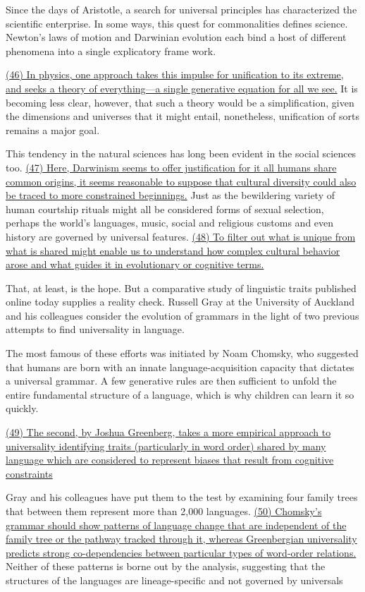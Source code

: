 
\qquad Since the days of Aristotle, a search for universal principles has characterized the scientific enterprise. In some ways, this quest for commonalities defines science. Newton's laws of motion and Darwinian evolution each bind a host of different phenomena into a single explicatory frame work.

\qquad \ul{(46) In physics, one approach takes this impulse for unification to its extreme, and seeks a theory of everything---a single generative equation for all we see.} It is becoming less clear, however, that such a theory would be a simplification, given the dimensions and universes that it might entail, nonetheless, unification of sorts remains a major goal.

\qquad This tendency in the natural sciences has long been evident in the social sciences too. \ul{(47) Here, Darwinism seems to offer justification for it all humans share common origins, it seems reasonable to suppose that cultural diversity could also be traced to more constrained beginnings.} Just as the bewildering variety of human courtship rituals might all be considered forms of sexual selection, perhaps the world's languages, music, social and religious customs and even history are governed by universal features. \ul{(48) To filter out what is unique from what is shared might enable us to understand how complex cultural behavior arose and what guides it in evolutionary or cognitive terms.}

\qquad That, at least, is the hope. But a comparative study of linguistic traits published online today supplies a reality check. Russell Gray at the University of Auckland and his colleagues consider the evolution of grammars in the light of two previous attempts to find universality in language.

\qquad The most famous of these efforts was initiated by Noam Chomsky, who suggested that humans are born with an innate language-acquisition capacity that dictates a universal grammar. A few generative rules are then sufficient to unfold the entire fundamental structure of a language, which is why children can learn it so quickly.

\qquad \ul{(49) The second, by Joshua Greenberg, takes a more empirical approach to universality identifying traits (particularly in word order) shared by many language which are considered to represent biases that result from cognitive constraints}

\qquad Gray and his colleagues have put them to the test by examining four family trees that between them represent more than 2,000 languages. \ul{(50) Chomsky's grammar should show patterns of language change that are independent of the family tree or the pathway tracked through it, whereas Greenbergian universality predicts strong co-dependencies between particular types of word-order relations.} Neither of these patterns is borne out by the analysis, suggesting that the structures of the languages are lineage-specific and not governed by universals 
